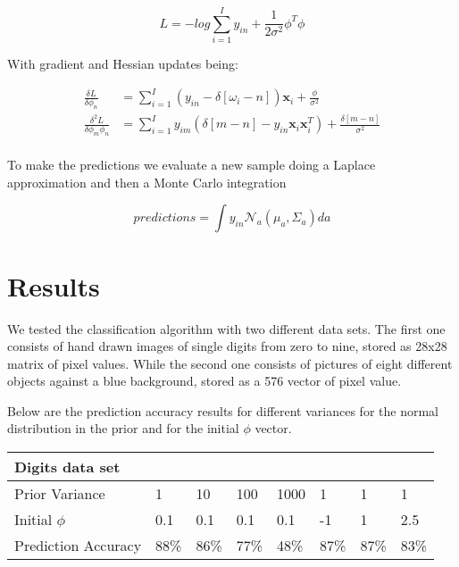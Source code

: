 \documentclass[12pt]{article}
\begin{document}
\begin{equation}
\label{L}
L = - log \sum_{i = 1}^{I} y_{in} + \frac{1}{2 \sigma^{2}} \phi^{T} \phi 
\end{equation}

With gradient and Hessian updates being:

\begin{align}
\label{Grad-Hess-Update}
\frac{\delta L}{ \delta \phi_{n}} &= \sum_{i = 1}^{I} \left( y_{in} - \delta \left[ \omega_{i} - n \right] \right) \mathbf{x}_{i}  + \frac{\phi} {\sigma^{2}} \nonumber \\
\frac{\delta^{2} L}{ \delta \phi_{m}\phi_{n}} &= \sum_{i = 1}^{I} y_{im} \left( \delta \left[ m - n \right] - y_{in} \mathbf{x}_{i} \mathbf{x}_{i}^{T}  \right) +  \frac{\delta \left[ m - n \right]}{\sigma^{2}} \nonumber \\
\end{align}

To make the predictions we evaluate a new sample doing a Laplace approximation and then a Monte Carlo integration

\begin{equation}
\label{Predictions}
predictions = \int y_{in} \mathcal{N}_{a} \left( \mu_{a}, \Sigma_{a} \right) da
\end{equation}
 
\section{Results}

We tested the classification algorithm with two different data sets.
The first one consists of hand drawn images of single digits from zero to nine,
stored as 28x28 matrix of pixel values.
While the second one consists of pictures of eight different objects against a blue background, stored as a 576 vector of pixel value.

Below are the prediction accuracy results for different variances for the normal distribution in the prior and for the initial $\phi$ vector. 

\begin{table}[h]
\begin{tabular}{l|lllllll}
Digits data set &  &  &  &  &  &  &  \\ \hline
Prior Variance & \multicolumn{1}{l|}{1} & \multicolumn{1}{l|}{10} & \multicolumn{1}{l|}{100} & \multicolumn{1}{l|}{1000} & \multicolumn{1}{l|}{1} & \multicolumn{1}{l|}{1} & \multicolumn{1}{l|}{1} \\ \hline
Initial $\phi$ & \multicolumn{1}{l|}{0.1} & \multicolumn{1}{l|}{0.1} & \multicolumn{1}{l|}{0.1} & \multicolumn{1}{l|}{0.1} & \multicolumn{1}{l|}{-1} & \multicolumn{1}{l|}{1} & \multicolumn{1}{l|}{2.5} \\ \hline
Prediction Accuracy & \multicolumn{1}{l|}{88\%} & \multicolumn{1}{l|}{86\%} & \multicolumn{1}{l|}{77\%} & \multicolumn{1}{l|}{48\%} & \multicolumn{1}{l|}{87\%} & \multicolumn{1}{l|}{87\%} & \multicolumn{1}{l|}{83\%} \\ \hline
\end{tabular}
\end{table}
\end{document}

